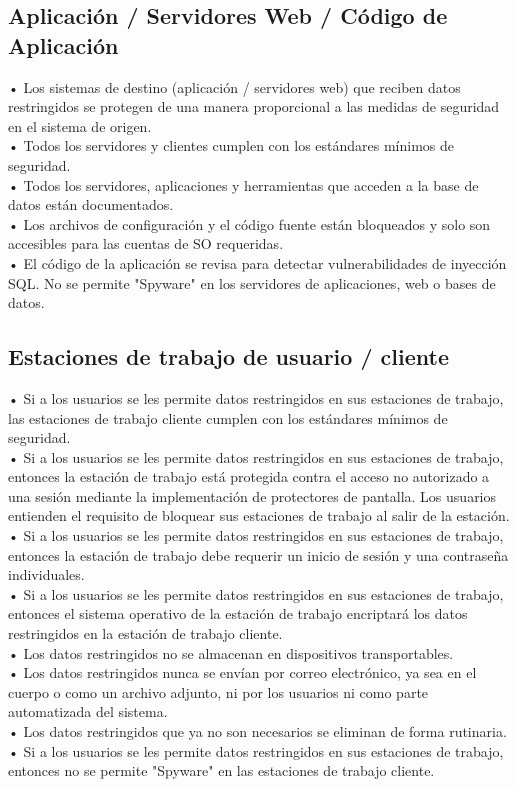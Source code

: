 \subsection{Aplicación / Servidores Web / Código de Aplicación}
• Los sistemas de destino (aplicación / servidores web) que reciben datos restringidos se protegen de una manera proporcional a las medidas de seguridad en el sistema de origen.\\
• Todos los servidores y clientes cumplen con los estándares mínimos de seguridad.\\
• Todos los servidores, aplicaciones y herramientas que acceden a la base de datos están documentados.\\
• Los archivos de configuración y el código fuente están bloqueados y solo son accesibles para las cuentas de SO requeridas.\\
• El código de la aplicación se revisa para detectar vulnerabilidades de inyección SQL.
No se permite "Spyware" en los servidores de aplicaciones, web o bases de datos.

\subsection{Estaciones de trabajo de usuario / cliente}
• Si a los usuarios se les permite datos restringidos en sus estaciones de trabajo, las estaciones de trabajo cliente cumplen con los estándares mínimos de seguridad.\\
• Si a los usuarios se les permite datos restringidos en sus estaciones de trabajo, entonces la estación de trabajo está protegida contra el acceso no autorizado a una sesión mediante la implementación de protectores de pantalla. Los usuarios entienden el requisito de bloquear sus estaciones de trabajo al salir de la estación.\\
• Si a los usuarios se les permite datos restringidos en sus estaciones de trabajo, entonces la estación de trabajo debe requerir un inicio de sesión y una contraseña individuales.\\
• Si a los usuarios se les permite datos restringidos en sus estaciones de trabajo, entonces el sistema operativo de la estación de trabajo encriptará los datos restringidos en la estación de trabajo cliente.\\
• Los datos restringidos no se almacenan en dispositivos transportables.\\
• Los datos restringidos nunca se envían por correo electrónico, ya sea en el cuerpo o como un archivo adjunto, ni por los usuarios ni como parte automatizada del sistema.\\
• Los datos restringidos que ya no son necesarios se eliminan de forma rutinaria.\\
• Si a los usuarios se les permite datos restringidos en sus estaciones de trabajo, entonces no se permite "Spyware" en las estaciones de trabajo cliente.


